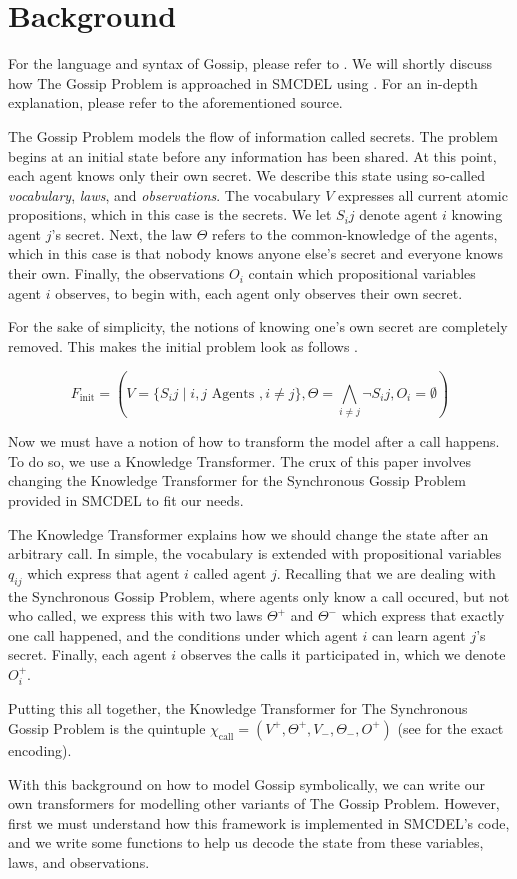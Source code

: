 \section{Background}\label{sec:Background}

For the language and syntax of Gossip, please refer to \cite{gattinger2023gomoche}. We will shortly discuss how The Gossip Problem is approached in SMCDEL using \cite{GattingerThesis2018}. For an in-depth explanation, please refer to the aforementioned source.

The Gossip Problem models the flow of information called secrets. The problem begins at an initial state before any information has been shared. At this point, each agent knows only their own secret. We describe this state using so-called \textit{vocabulary}, \textit{laws}, and \textit{observations}. The vocabulary $V$ expresses all current atomic propositions, which in this case is the secrets. We let $S_ij$ denote agent $i$ knowing agent $j$'s secret. Next, the law $\Theta$ refers to the common-knowledge of the agents, which in this case is that nobody knows anyone else's secret and everyone knows their own. Finally, the observations $O_i$ contain which propositional variables agent $i$ observes, to begin with, each agent only observes their own secret. 

For the sake of simplicity, the notions of knowing one's own secret are completely removed. This makes the initial problem look as follows \cite{GattingerThesis2018}.

$$F_\text{init} = (V = \{S_ij \mid i, j \text{ Agents }, i \neq j\}, \Theta =\bigwedge_{i\neq j} \lnot S_ij , O_i = \emptyset)$$ 

Now we must have a notion of how to transform the model after a call happens. To do so, we use a Knowledge Transformer. The crux of this paper involves changing the Knowledge Transformer for the Synchronous Gossip Problem provided in SMCDEL to fit our needs. 

The Knowledge Transformer explains how we should change the state after an arbitrary call. In simple, the vocabulary is extended with propositional variables $q_{ij}$ which express that agent $i$ called agent $j$. Recalling that we are dealing with the Synchronous Gossip Problem, where agents only know a call occured, but not who called, we express this with two laws $\Theta^+$ and $\Theta^-$ which express that exactly one call happened, and the conditions under which agent $i$ can learn agent $j$'s secret. Finally, each agent $i$ observes the calls it participated in, which we denote $O^+_i$. 

Putting this all together, the Knowledge Transformer for The Synchronous Gossip Problem is the quintuple $\chi_\text{call}=(V^+,\Theta ^+,V_-,\Theta _-,O^+)$ (see \cite{GattingerThesis2018} for the exact encoding).

With this background on how to model Gossip symbolically, we can write our own transformers for modelling other variants of The Gossip Problem. However, first we must understand how this framework is implemented in SMCDEL's code, and we write some functions to help us decode the state from these variables, laws, and observations.
